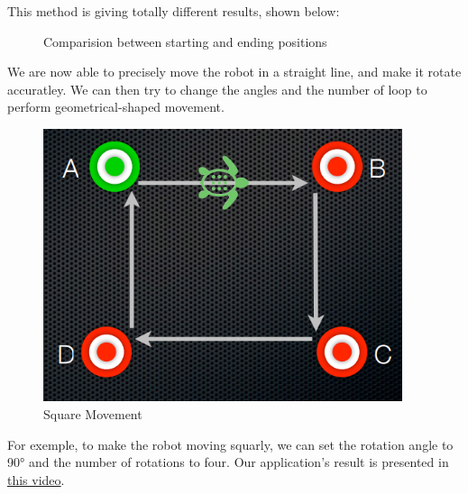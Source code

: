 \documentclass[aps,letterpaper,11pt]{revtex4}
\begin{document}
This method is giving totally different results, shown below: 

\begin{figure}[H]
    \centering
    \qquad
    \caption{Comparision between starting and ending positions}
    \label{fig:example}%
\end{figure}

We are now able to precisely move the robot in a straight line, and make it rotate accuratley. We can then try to change the angles and the number of loop to perform geometrical-shaped movement. 
\begin{figure}[H]
	\centering
	\includegraphics[height=8cm]{square.png}
	\caption{Square Movement}
	\label{fig: Square Movement}    
\end{figure}
For exemple, to make the robot moving squarly, we can set the rotation angle to 90° and the number of rotations to four. Our application's result is presented in \href{https://www.youtube.com/watch?v=kcxKbuMNRy4g}{this video}.
\end{document}
